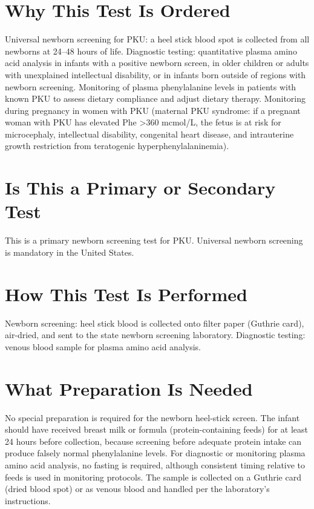 \section*{Why This Test Is Ordered}
Universal newborn screening for PKU: a heel stick blood spot is collected from all newborns at 24--48 hours of life. Diagnostic testing: quantitative plasma amino acid analysis in infants with a positive newborn screen, in older children or adults with unexplained intellectual disability, or in infants born outside of regions with newborn screening. Monitoring of plasma phenylalanine levels in patients with known PKU to assess dietary compliance and adjust dietary therapy. Monitoring during pregnancy in women with PKU (maternal PKU syndrome: if a pregnant woman with PKU has elevated Phe >360 mcmol/L, the fetus is at risk for microcephaly, intellectual disability, congenital heart disease, and intrauterine growth restriction from teratogenic hyperphenylalaninemia).

\section*{Is This a Primary or Secondary Test}
This is a primary newborn screening test for PKU. Universal newborn screening is mandatory in the United States.

\section*{How This Test Is Performed}
Newborn screening: heel stick blood is collected onto filter paper (Guthrie card), air-dried, and sent to the state newborn screening laboratory. Diagnostic testing: venous blood sample for plasma amino acid analysis.

\section*{What Preparation Is Needed}
No special preparation is required for the newborn heel-stick screen. The infant should have received breast milk or formula (protein-containing feeds) for at least 24 hours before collection, because screening before adequate protein intake can produce falsely normal phenylalanine levels. For diagnostic or monitoring plasma amino acid analysis, no fasting is required, although consistent timing relative to feeds is used in monitoring protocols. The sample is collected on a Guthrie card (dried blood spot) or as venous blood and handled per the laboratory's instructions.

